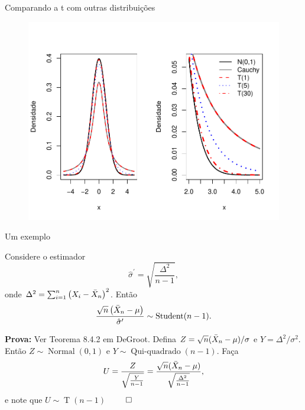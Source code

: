 \begin{frame}{Comparando a t com outras distribuições}
\begin{figure}[!ht]
 \begin{center}
  \includegraphics[scale=.6]{figures/comparacao_t_Student.pdf}
 \end{center}
\end{figure} 
\end{frame}

\begin{frame}{Um exemplo}
\begin{theo}
\label{thm:unbiased_variance_estimator_StudentT}
 Considere o estimador 
 \begin{equation*}
  \hat{\sigma}^\prime = \sqrt{\frac{\Delta^2}{n-1}},
 \end{equation*}
onde $\Delta^2 = \sum_{i=1}^n \left(X_i - \bar{X}_n\right)^2$.
Então 
\begin{equation*}
 \frac{\sqrt{n}\left(\bar{X}_n - \mu\right)}{\hat{\sigma}^\prime} \sim \operatorname{Student}(n-1).
\end{equation*}
\end{theo}
\textbf{Prova:}
Ver Teorema 8.4.2 em DeGroot.
Defina $Z = \sqrt{n}(\bar{X}_n - \mu)/\sigma$ e $Y = \Delta^2/\sigma^2$.
Então $Z \sim\operatorname{Normal}(0,1)$ e $Y\sim\operatorname{Qui-quadrado}(n-1)$.
Faça
\begin{equation}
 U = \frac{Z}{\sqrt{\frac{Y}{n-1}}} = \frac{\sqrt{n}(\bar{X}_n-\mu)}{\sqrt{\frac{\Delta^2}{n-1}}},
\end{equation}
e note que $U \sim \operatorname{T}(n-1)$  $\qed$
\end{frame}

